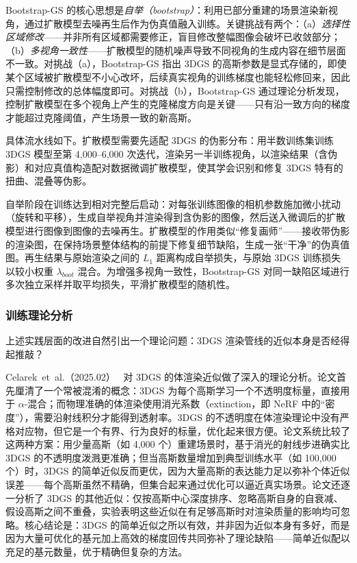 Bootstrap-GS 的核心思想是\emph{自举（bootstrap）}：利用已部分重建的场景渲染新视角，通过扩散模型去噪再生后作为伪真值融入训练。关键挑战有两个：（a）\emph{选择性区域修改}——并非所有区域都需要修正，盲目修改整幅图像会破坏已收敛部分；（b）\emph{多视角一致性}——扩散模型的随机噪声导致不同视角的生成内容在细节层面不一致。对挑战（a），Bootstrap-GS 指出 3DGS 的高斯参数是显式存储的，即使某个区域被扩散模型不小心改坏，后续真实视角的训练梯度也能轻松修回来，因此只需控制修改的总体幅度即可。对挑战（b），Bootstrap-GS 通过理论分析发现，控制扩散模型在多个视角上产生的克隆梯度方向是关键——只有沿一致方向的梯度才能超过克隆阈值，产生场景一致的新高斯。

具体流水线如下。扩散模型需要先适配 3DGS 的伪影分布：用半数训练集训练 3DGS 模型至第 4,000--6,000 次迭代，渲染另一半训练视角，以渲染结果（含伪影）和对应真值构造配对数据微调扩散模型，使其学会识别和修复 3DGS 特有的扭曲、混叠等伪影。

自举阶段在训练达到相对完整后启动：对每张训练图像的相机参数施加微小扰动（旋转和平移），生成自举视角并渲染得到含伪影的图像，然后送入微调后的扩散模型进行图像到图像的去噪再生。扩散模型的作用类似``修复画师''——接收带伪影的渲染图，在保持场景整体结构的前提下修复细节缺陷，生成一张``干净''的伪真值图。再生结果与原始渲染之间的 $L_1$ 距离构成自举损失，与原始 3DGS 训练损失以较小权重 $\lambda_{boot}$ 混合。为增强多视角一致性，Bootstrap-GS 对同一缺陷区域进行多次独立采样并取平均损失，平滑扩散模型的随机性。

\subsubsection{训练理论分析}

上述实践层面的改进自然引出一个理论问题：3DGS 渲染管线的近似本身是否经得起推敲？

Celarek~et~al.（2025.02）~\cite{2502_19318} 对 3DGS 的体渲染近似做了深入的理论分析。论文首先厘清了一个常被混淆的概念：3DGS 为每个高斯学习一个不透明度标量，直接用于 $\alpha$-混合；而物理准确的体渲染使用消光系数（extinction，即 NeRF 中的``密度''），需要沿射线积分才能得到透射率。3DGS 的不透明度在体渲染理论中没有严格对应物，但它是一个有界、行为良好的标量，优化起来很方便。论文系统比较了这两种方案：用少量高斯（如 4,000 个）重建场景时，基于消光的射线步进确实比 3DGS 的不透明度泼溅更准确；但当高斯数量增加到典型训练水平（如 100,000 个）时，3DGS 的简单近似反而更优，因为大量高斯的表达能力足以弥补个体近似误差——每个高斯虽然不精确，但集合起来通过优化可以逼近真实场景。论文还逐一分析了 3DGS 的其他近似：仅按高斯中心深度排序、忽略高斯自身的自衰减、假设高斯之间不重叠，实验表明这些近似在有足够高斯时对渲染质量的影响均可忽略。核心结论是：3DGS 的简单近似之所以有效，并非因为近似本身有多好，而是因为大量可优化的基元加上高效的梯度回传共同弥补了理论缺陷——简单近似配以充足的基元数量，优于精确但复杂的方法。

